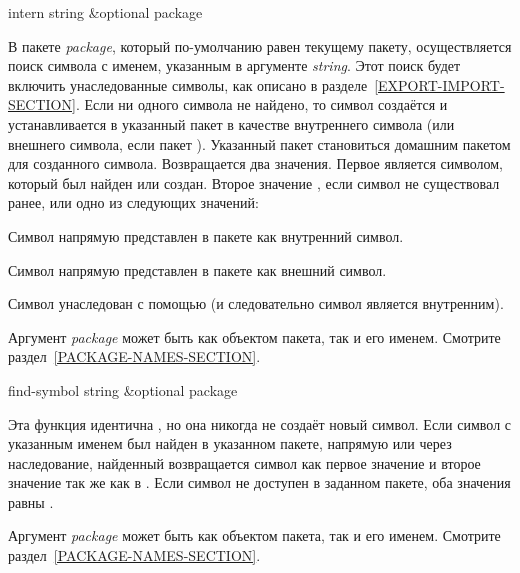 \begin{defun}[Функция]
intern string &optional package

В пакете \emph{package}, который по-умолчанию равен текущему пакету,
осуществляется поиск символа с именем, указанным в аргументе \emph{string}. Этот
поиск будет включить унаследованные символы, как описано в
разделе~\ref{EXPORT-IMPORT-SECTION}.
Если ни одного символа не найдено, то символ создаётся и устанавливается в
указанный пакет в качестве внутреннего символа (или внешнего символа, если пакет
). Указанный пакет становиться домашним пакетом для созданного символа.
Возвращается два значения. Первое является символом, который был найден или
создан. Второе значение {\false}, если символ не существовал ранее, или одно из
следующих значений:
\begin{indentdesc}{6pc}
\item[\cd{:internal}] Символ напрямую представлен в пакете как
  внутренний символ.

\item[\cd{:external}] Символ напрямую представлен в пакете как внешний
  символ.

\item[\cd{:inherited}] Символ унаследован с помощью 
  (и следовательно символ является внутренним).
\end{indentdesc}

Аргумент \emph{package} может быть как объектом пакета, так и его
именем. Смотрите раздел~\ref{PACKAGE-NAMES-SECTION}.
\end{defun}

\begin{defun}[Функция]
find-symbol string &optional package

Эта функция идентична , но она никогда не создаёт новый символ. Если
символ с указанным именем был найден в указанном пакете, напрямую или через
наследование, найденный возвращается символ как первое значение и второе
значение так же как в . Если символ не доступен в заданном пакете,
оба значения равны {\false}.

Аргумент \emph{package} может быть как объектом пакета, так и его
именем. Смотрите раздел~\ref{PACKAGE-NAMES-SECTION}.
\end{defun}

